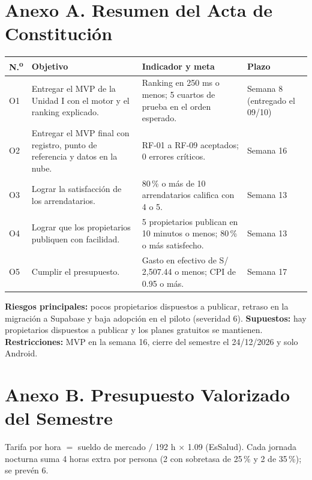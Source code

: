 \documentclass[11pt,a4paper]{article}
\begin{document}
\section*{\textcolor{AzulUNA}{Anexo A. Resumen del Acta de Constitución}}
{\small
{}
\noindent\begin{tabularx}{\textwidth}{@{}C{0.7cm} L L P{2.4cm}@{}}
\toprule
{}
\textbf{N.\textsuperscript{o}} & \textbf{Objetivo} & \textbf{Indicador y meta} & \textbf{Plazo} \\
\midrule
O1 & Entregar el MVP de la Unidad I con el motor y el ranking explicado. & Ranking en 250 ms o menos; 5 cuartos de prueba en el orden esperado. & Semana 8 (entregado el 09/10) \\
O2 & Entregar el MVP final con registro, punto de referencia y datos en la nube. & RF-01 a RF-09 aceptados; 0 errores críticos. & Semana 16 \\
O3 & Lograr la satisfacción de los arrendatarios. & 80\,\% o más de 10 arrendatarios califica con 4 o 5. & Semana 13 \\
O4 & Lograr que los propietarios publiquen con facilidad. & 5 propietarios publican en 10 minutos o menos; 80\,\% o más satisfecho. & Semana 13 \\
O5 & Cumplir el presupuesto. & Gasto en efectivo de S/ 2,507.44 o menos; CPI de 0.95 o más. & Semana 17 \\
\bottomrule
\end{tabularx}
}

\vspace{0.15cm}
\noindent\textbf{Riesgos principales:} pocos propietarios dispuestos a publicar, retraso en la migración a Supabase y baja adopción en el piloto (severidad 6). \textbf{Supuestos:} hay propietarios dispuestos a publicar y los planes gratuitos se mantienen. \textbf{Restricciones:} MVP en la semana 16, cierre del semestre el 24/12/2026 y solo Android.

\section*{\textcolor{AzulUNA}{Anexo B. Presupuesto Valorizado del Semestre}}
\noindent Tarifa por hora $=$ sueldo de mercado $/$ 192 h $\times$ 1.09 (EsSalud). Cada jornada nocturna suma 4 horas extra por persona (2 con sobretasa de 25\,\% y 2 de 35\,\%); se prevén 6.
\end{document}
